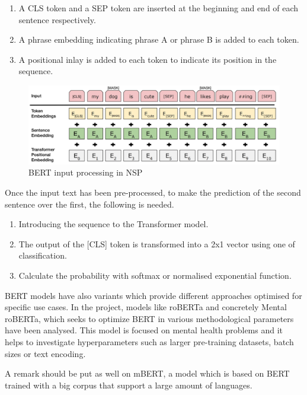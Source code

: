 \begin{enumerate}
    \item A CLS token and a SEP token are inserted at the beginning and end of each sentence respectively.
    \item A phrase embedding indicating phrase A or phrase B is added to each token.
    \item A positional inlay is added to each token to indicate its position in the sequence.
\end{enumerate}

\begin{figure}[!htp]
    \centering
    \includegraphics[scale=0.35]{img/detection/BERTinput.png}
    \caption{BERT input processing in NSP}
    \label{fig:BERTinput}
\end{figure}
Once the input text has been pre-processed, to make the prediction of the second sentence over the first, the following is needed.

\begin{enumerate}
    \item Introducing the sequence to the Transformer model.
    \item The output of the [CLS] token is transformed into a 2x1 vector using one of classification.
    \item Calculate the probability with softmax or normalised exponential function.
\end{enumerate}

BERT models have also variants which provide different approaches optimised for specific use cases. In the project, models like roBERTa and concretely Mental roBERTa, which seeks to optimize BERT in various methodological parameters have been analysed. This model is focused on mental health problems and it helps to investigate hyperparameters such as larger pre-training datasets, batch sizes or text encoding.

A remark should be put as well on mBERT, a model which is based on BERT trained with a big corpus that support a large amount of languages. \\


